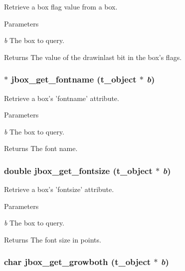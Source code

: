 Retrieve a box flag value from a box. 
\begin{DoxyParams}{Parameters}
\item[{\em b}]The box to query. \end{DoxyParams}
\begin{DoxyReturn}{Returns}
The value of the drawinlast bit in the box's flags. 
\end{DoxyReturn}
\hypertarget{group__jbox_ga5a5801f294c0c6f8c5cefc686bffcdfb}{
\subsubsection[{jbox\_\-get\_\-fontname}]{$\ast$ jbox\_\-get\_\-fontname ({\bf t\_\-object} $\ast$ {\em b})}}
\label{group__jbox_ga5a5801f294c0c6f8c5cefc686bffcdfb}


Retrieve a box's 'fontname' attribute. 
\begin{DoxyParams}{Parameters}
\item[{\em b}]The box to query. \end{DoxyParams}
\begin{DoxyReturn}{Returns}
The font name. 
\end{DoxyReturn}
\hypertarget{group__jbox_ga5ea741cbdbedbb94e93292fe9fdf4976}{
\subsubsection[{jbox\_\-get\_\-fontsize}]{\setlength{\rightskip}{0pt plus 5cm}double jbox\_\-get\_\-fontsize ({\bf t\_\-object} $\ast$ {\em b})}}
\label{group__jbox_ga5ea741cbdbedbb94e93292fe9fdf4976}


Retrieve a box's 'fontsize' attribute. 
\begin{DoxyParams}{Parameters}
\item[{\em b}]The box to query. \end{DoxyParams}
\begin{DoxyReturn}{Returns}
The font size in points. 
\end{DoxyReturn}
\hypertarget{group__jbox_gaecf5b94b11c026032d94d6746d06955f}{
\subsubsection[{jbox\_\-get\_\-growboth}]{\setlength{\rightskip}{0pt plus 5cm}char jbox\_\-get\_\-growboth ({\bf t\_\-object} $\ast$ {\em b})}}
\label{group__jbox_gaecf5b94b11c026032d94d6746d06955f}


